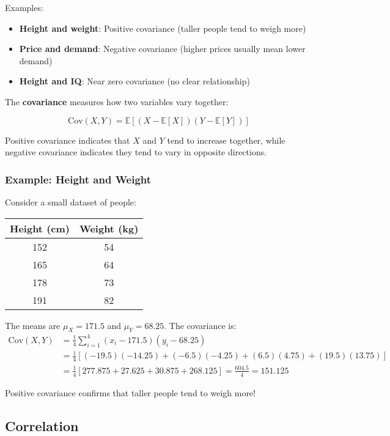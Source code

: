 Examples:
\begin{itemize}
    \item \textbf{Height and weight}: Positive covariance (taller people tend to weigh more)
    \item \textbf{Price and demand}: Negative covariance (higher prices usually mean lower demand)
    \item \textbf{Height and IQ}: Near zero covariance (no clear relationship)
\end{itemize}

The \textbf{covariance} measures how two variables vary together:

\begin{equation}
\text{Cov}(X, Y) = \mathbb{E}[(X - \mathbb{E}[X])(Y - \mathbb{E}[Y])]
\end{equation}

Positive covariance indicates that $X$ and $Y$ tend to increase together, while negative covariance indicates they tend to vary in opposite directions.

\subsubsection{Example: Height and Weight}

Consider a small dataset of people:
\begin{center}
\begin{tabular}{|c|c|}
\hline
Height (cm) & Weight (kg) \\
\hline
152 & 54 \\
165 & 64 \\
178 & 73 \\
191 & 82 \\
\hline
\end{tabular}
\end{center}

The means are $\mu_X = 171.5$ and $\mu_Y = 68.25$. The covariance is:
\begin{align}
\text{Cov}(X,Y) &= \frac{1}{4}\sum_{i=1}^{4}(x_i - 171.5)(y_i - 68.25) \\
&= \frac{1}{4}[(-19.5)(-14.25) + (-6.5)(-4.25) + (6.5)(4.75) + (19.5)(13.75)] \\
&= \frac{1}{4}[277.875 + 27.625 + 30.875 + 268.125] = \frac{604.5}{4} = 151.125
\end{align}

Positive covariance confirms that taller people tend to weigh more!

\subsection{Correlation}

